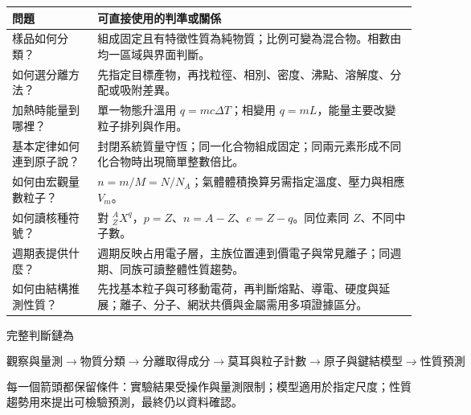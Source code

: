 \documentclass[11pt,a4paper]{article}
\newcounter{none}
\begin{document}
{\def\LTcaptype{none} %
\begin{longtable}[]{@{}
  >{\raggedright\arraybackslash}p{}
  >{\raggedright\arraybackslash}p{}@{}}
\toprule\noalign{}
\begin{minipage}[b]{\linewidth}\raggedright
問題
\end{minipage} & \begin{minipage}[b]{\linewidth}\raggedright
可直接使用的判準或關係
\end{minipage} \\
\midrule\noalign{}
\endhead
\bottomrule\noalign{}
\endlastfoot
樣品如何分類？ & 組成固定且有特徵性質為純物質；比例可變為混合物。相數由均一區域與界面判斷。 \\
如何選分離方法？ & 先指定目標產物，再找粒徑、相別、密度、沸點、溶解度、分配或吸附差異。 \\
加熱時能量到哪裡？ & 單一物態升溫用 \(q=mc\Delta T\)；相變用 \(q=mL\)，能量主要改變粒子排列與作用。 \\
基本定律如何連到原子說？ & 封閉系統質量守恆；同一化合物組成固定；同兩元素形成不同化合物時出現簡單整數倍比。 \\
如何由宏觀量數粒子？ & \(n=m/M=N/N_A\)；氣體體積換算另需指定溫度、壓力與相應 \(V_m\)。 \\
如何讀核種符號？ & 對 \({}^{A}_{Z}X^q\)，\(p=Z\)、\(n=A-Z\)、\(e=Z-q\)。同位素同 \(Z\)、不同中子數。 \\
週期表提供什麼？ & 週期反映占用電子層，主族位置連到價電子與常見離子；同週期、同族可讀整體性質趨勢。 \\
如何由結構推測性質？ & 先找基本粒子與可移動電荷，再判斷熔點、導電、硬度與延展；離子、分子、網狀共價與金屬需用多項證據區分。 \\
\end{longtable}
}

完整判斷鏈為

\[
\boxed{\text{觀察與量測}\rightarrow\text{物質分類}\rightarrow\text{分離取得成分}\rightarrow
\text{莫耳與粒子計數}\rightarrow\text{原子與鍵結模型}\rightarrow\text{性質預測}}.
\]

每一個箭頭都保留條件：實驗結果受操作與量測限制；模型適用於指定尺度；性質趨勢用來提出可檢驗預測，最終仍以資料確認。
\end{document}

